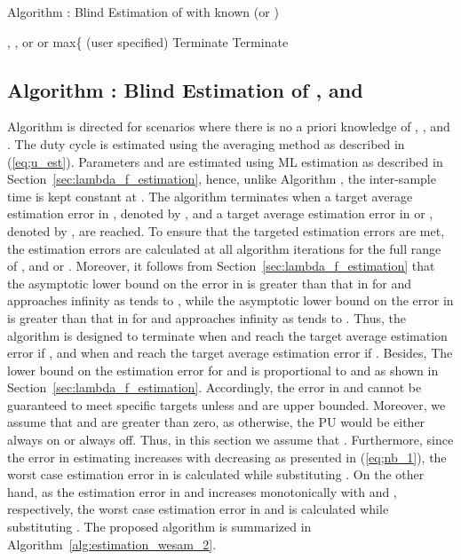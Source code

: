 \documentclass[11pt,draftclsnofoot,journal,onecolumn]{IEEEtran}
\begin{document}
\begin{algorithm}[t]
\centering
\caption{Algorithm : Blind Estimation of  with known  (or )}
\label{alg:estimation_wesam_1}
\begin{algorithmic}[1]
\REQUIRE , , 
\ENSURE  or  or max\{ (user specified)
	\STATE Terminate
	\ENDIF
\ENDWHILE
\WHILE {}
	\STATE Terminate
	\ENDIF
\ENDWHILE
{}
\ENDWHILE
\end{algorithmic}
\end{algorithm}

\subsection{Algorithm : Blind Estimation of ,  and }
\label{sec:algorithm_II}

Algorithm  is directed for scenarios where there is no a priori knowledge of , , and . The duty cycle is estimated using the averaging method as described in (\ref{eq;u_est}). Parameters  and  are estimated using ML estimation as described in Section~\ref{sec:lambda_f_estimation}, hence, unlike Algorithm , the inter-sample time is kept constant at . The algorithm terminates when a target average estimation error in , denoted by , and a target average estimation error in  or , denoted by , are reached. To ensure that the targeted estimation errors are met, the estimation errors are calculated at all algorithm iterations for the full range of , and  or . Moreover, it follows from Section~\ref{sec:lambda_f_estimation} that the asymptotic lower bound on the error in  is greater than that in  for  and approaches infinity as  tends to , while the asymptotic lower bound on the error in  is greater than that in  for  and approaches infinity as  tends to . Thus, the algorithm is designed to terminate when  and  reach the target average estimation error if , and when  and  reach the target average estimation error if . Besides, The lower bound on the estimation error for  and  is proportional to  and  as shown in Section~\ref{sec:lambda_f_estimation}. Accordingly, the error in  and  cannot be guaranteed to meet specific targets unless  and  are upper bounded. Moreover, we assume that  and  are greater than zero, as otherwise, the PU would be either always on or always off. Thus, in this section we assume that . Furthermore, since the error in estimating  increases with decreasing  as presented in (\ref{eq;nb_1}), the worst case estimation error in  is calculated while substituting . On the other hand, as the estimation error in  and  increases monotonically with  and , respectively, the worst case estimation error in  and  is calculated while substituting . The proposed algorithm is summarized in Algorithm~\ref{alg:estimation_wesam_2}.
\end{document}
